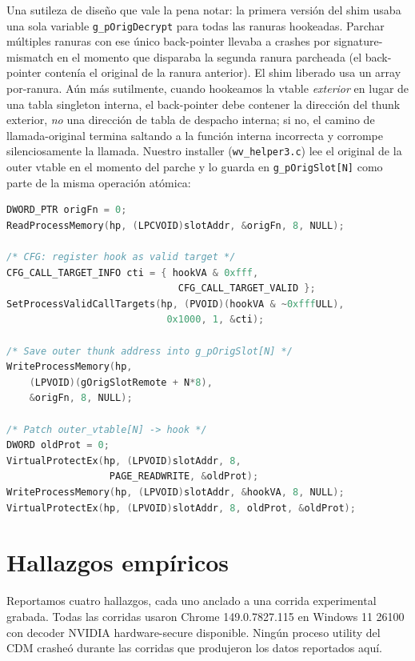 \documentclass[11pt,letterpaper]{article}
\let\oldsection\section
\renewcommand{\section}{\clearpage\oldsection}
\begin{document}
Una sutileza de diseño que vale la pena notar: la primera versión
del shim usaba una sola variable \texttt{g\_pOrigDecrypt} para
todas las ranuras hookeadas. Parchar múltiples ranuras con ese
único back-pointer llevaba a crashes por signature-mismatch en el
momento que disparaba la segunda ranura parcheada (el back-pointer
contenía el original de la ranura anterior). El shim liberado usa
un array por-ranura. Aún más sutilmente, cuando hookeamos la
vtable \emph{exterior} en lugar de una tabla singleton interna,
el back-pointer debe contener la dirección del thunk exterior,
\emph{no} una dirección de tabla de despacho interna; si no, el
camino de llamada-original termina saltando a la función interna
incorrecta y corrompe silenciosamente la llamada. Nuestro
installer (\texttt{wv\_helper3.c}) lee el original de la outer
vtable en el momento del parche y lo guarda en
\texttt{g\_pOrigSlot[N]} como parte de la misma operación
atómica:

\begin{lstlisting}[language=C, basicstyle=\ttfamily\scriptsize]
DWORD_PTR origFn = 0;
ReadProcessMemory(hp, (LPCVOID)slotAddr, &origFn, 8, NULL);

/* CFG: register hook as valid target */
CFG_CALL_TARGET_INFO cti = { hookVA & 0xfff,
                              CFG_CALL_TARGET_VALID };
SetProcessValidCallTargets(hp, (PVOID)(hookVA & ~0xfffULL),
                            0x1000, 1, &cti);

/* Save outer thunk address into g_pOrigSlot[N] */
WriteProcessMemory(hp,
    (LPVOID)(gOrigSlotRemote + N*8),
    &origFn, 8, NULL);

/* Patch outer_vtable[N] -> hook */
DWORD oldProt = 0;
VirtualProtectEx(hp, (LPVOID)slotAddr, 8,
                  PAGE_READWRITE, &oldProt);
WriteProcessMemory(hp, (LPVOID)slotAddr, &hookVA, 8, NULL);
VirtualProtectEx(hp, (LPVOID)slotAddr, 8, oldProt, &oldProt);
\end{lstlisting}

\section{Hallazgos empíricos}
\label{sec:findings}

Reportamos cuatro hallazgos, cada uno anclado a una corrida
experimental grabada. Todas las corridas usaron Chrome
149.0.7827.115 en Windows 11 26100 con decoder NVIDIA
hardware-secure disponible. Ningún proceso utility del CDM
crasheó durante las corridas que produjeron los datos reportados
aquí.
\end{document}
